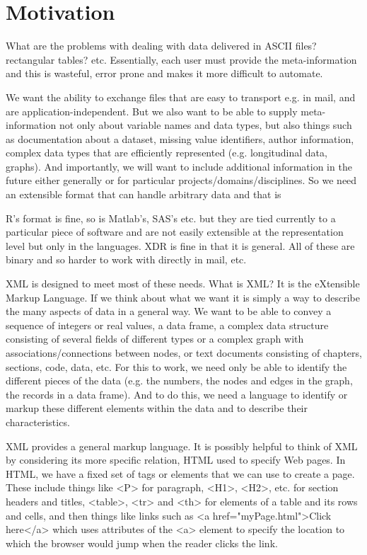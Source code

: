 \section{Motivation}
What are the problems with dealing with data delivered in ASCII files?
rectangular tables? etc.  Essentially, each user must provide the
meta-information and this is wasteful, error prone and makes it more
difficult to automate.

We want the ability to exchange files  that are easy to transport
e.g. in mail, and are application-independent.
But we also want to be able to supply meta-information
not only about variable names and data types, but also 
things such as documentation about a dataset, missing value
identifiers, author information, complex data types that are
efficiently represented (e.g. longitudinal data,
graphs).  And importantly, we will want
to include additional information in the future
either generally or for particular projects/domains/disciplines.
So we need an extensible format that can handle arbitrary data
and that is 

R's format is fine, so is Matlab's, SAS's etc. but they are tied
currently to a particular piece of software and are not easily
extensible at the representation level but only in the languages.  XDR
is fine in that it is general.  All of these are binary and so harder
to work with directly in mail, etc.

XML is designed to meet most of these needs.  What is XML? It is the
eXtensible Markup Language.  If we think about what we want it is
simply a way to describe the many aspects of data in a general way.
We want to be able to convey a sequence of integers or real values, a
data frame, a complex data structure consisting of several fields of
different types or a complex graph with associations/connections
between nodes, or text documents consisting of chapters, sections,
code, data, etc.  For this to work, we need only be able to identify
the different pieces of the data (e.g. the numbers, the nodes and
edges in the graph, the records in a data frame).  And to do this, we
need a language to identify or markup these different elements within
the data and to describe their characteristics.

XML provides a general markup language.  It is possibly helpful to
think of XML by considering its more specific relation, HTML used to
specify Web pages.  In HTML, we have a fixed set of tags or elements
that we can use to create a page.  These include things like <P> for
paragraph, <H1>, <H2>, etc. for section headers and titles, <table>,
<tr> and <th> for elements of a table and its rows and cells, and then
things like links such as <a href="myPage.html">Click here</a>
which uses attributes of the <a> element to specify the location
to which the browser would jump when the reader clicks the link.

